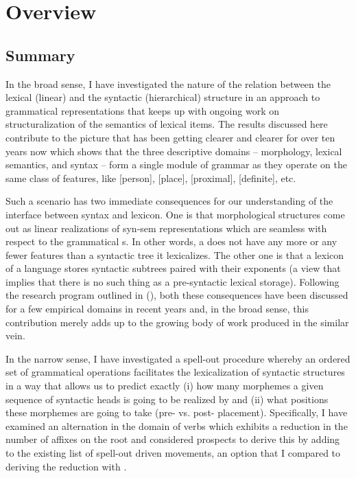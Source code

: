 \chapter{Overview}\label{chapter:conclusion}

\section{Summary}

In the broad sense, I have investigated the nature of the relation between the lexical (linear) and the syntactic (hierarchical) structure in an approach to grammatical representations that keeps up with ongoing work on structuralization of the semantics of lexical items. The results discussed here contribute to the picture that has been getting clearer and clearer for over ten years now which shows that the three descriptive domains -- morphology, lexical semantics, and syntax -- form a single module of grammar as they operate on the same class of features, like [person], [place], [proximal], [definite], etc.
\par
Such a scenario has two immediate consequences for our understanding of the interface between syntax and lexicon.  One is that morphological structures come out as linear realizations of syn-sem representations  which are seamless with respect to the grammatical s. In other words, a  does not have any more or any fewer features than a syntactic tree it lexicalizes.  The other one is that a lexicon of a language stores syntactic subtrees paired with their exponents (a view that implies that there is no such thing as a pre-syntactic lexical storage). Following the research program outlined in \citeauthor{Starke2009} (\citeyear{Starke2009,StarkeLA}), both these consequences have been discussed for a few empirical domains in recent years and, in the broad sense, this contribution merely adds up to the growing body of work produced in the similar vein. 
\par
In the narrow sense, I have investigated a spell-out procedure whereby an ordered set of grammatical operations facilitates the  lexicalization of syntactic structures in a way that allows us to predict exactly (i) how many morphemes a given sequence of syntactic heads is going to be realized by and (ii) what positions these morphemes are going to take (pre- vs. post- placement). Specifically, I have examined an  alternation in the domain of  verbs which exhibits a  reduction in the number of affixes on the root and considered prospects to derive this  by adding  to the existing list of spell-out driven movements, an option that I compared to deriving the reduction with .
